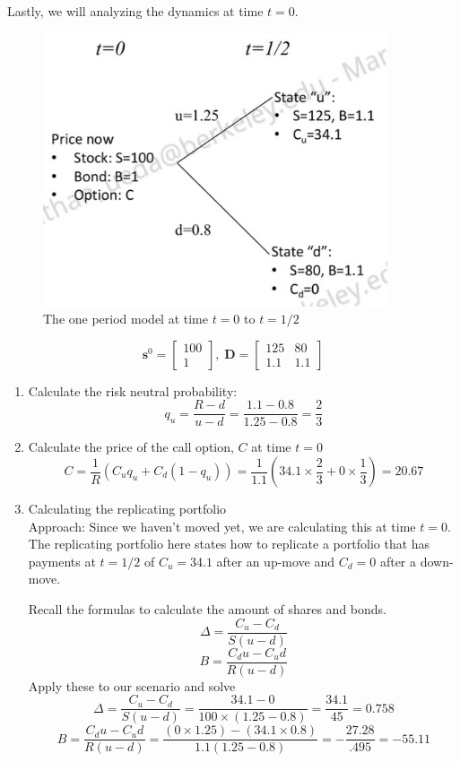 \documentclass[11pt]{article}
\begin{document}
Lastly, we will analyzing the dynamics at time $t=0$.


\begin{figure}[H] 
    \centering 
    \includegraphics[width=4in]{imgs/two_period_two_state_bin_tree_model_initial.jpeg}
    \caption{The one period model at time $t=0$ to $t=1/2$}
\end{figure}

\[ 
    \boldsymbol{s}^0 = 
    \begin{bmatrix}
        100 \\ 
        1     
    \end{bmatrix}, \;
    \boldsymbol{D} = 
    \begin{bmatrix}
        125 & 80 \\
        1.1 & 1.1 
    \end{bmatrix}
\]

\begin{enumerate}
    \item Calculate the risk neutral probability:
    \[
      q_u = \frac{R-d}{u-d} = \frac{1.1-0.8}{1.25-0.8} = \frac{2}{3}   
    \]
    \item Calculate the price of the call option, $C$ at time $t=0$
    \[
      C = \frac{1}{R}(C_{u} q_u + C_{d} (1-q_u))
      = \frac{1}{1.1} (34.1 \times \frac{2}{3} + 0 \times \frac{1}{3})  
      = 20.67
    \]
    \item Calculating the replicating portfolio \\
    Approach: Since we haven't moved yet, we are calculating this at time $t=0$. The
    replicating portfolio here states how to replicate a portfolio that has payments at $t=1/2$ of 
    $C_{u}=34.1$ after an up-move and $C_{d} = 0$ after a down-move.
    
    Recall the formulas to calculate the amount of shares and bonds.
    \[\Delta = \frac{C_u - C_d}{S (u-d)}\]
    \[B = \frac{C_d u- C_u d}{R(u-d)}\]
    Apply these to our scenario and solve
    \[
    \Delta = \frac{C_{u} - C_{d}}{S (u-d)} 
    = \frac{34.1 - 0}{100 \times (1.25-0.8)}
    = \frac{34.1}{45}
    = 0.758
    \]
    \[
    B = \frac{C_{d}u - C_{u} d}{R(u-d)}
    = \frac{(0 \times 1.25) - (34.1 \times 0.8)}{1.1(1.25-0.8)}
    = -\frac{27.28}{.495}
    = -55.11
    \]
\end{enumerate}
\end{document}

